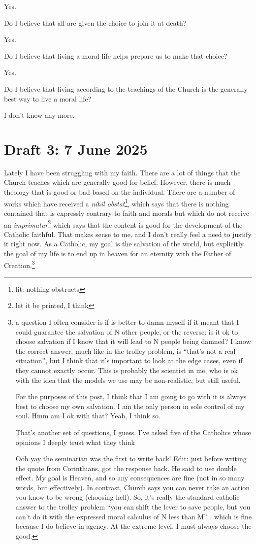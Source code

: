 \documentclass[12pt]{article}
\newcommand{\say}[1]{``#1''}
\renewcommand{\,}{\textsuperscript{,}}
\begin{document}
Yes.

Do I believe that all are given the choice to join it at death?

Yes.

Do I believe that living a moral life helps prepare us to make that choice?

Yes.

Do I believe that living according to the teachings of the Church is the generally best way to live a moral life?

I don't know any more.

\section{Draft 3: 7 June 2025}

Lately I have been struggling with my faith.  
There are a lot of things that the Church teaches which are generally good for belief.  
However, there is much theology that is good or bad based on the individual.  
There are a number of works which have received a \textit{nihil obstat}\footnote{lit: nothing obstructs}, which says that there is nothing contained that is expressly contrary to faith and morals but which do not receive an \textit{imprimatur}\footnote{let it be printed, I think} which says that the content is good for the development of the Catholic faithful.  
That makes sense to me, and I don't really feel a need to justify it right now.  
As a Catholic, my goal is the salvation of the world, but explicitly the goal of my life is to end up in heaven for an eternity with the Father of Creation.\footnote{a question I often consider is if is better to damn myself if it meant that I could guarantee the salvation of N other people, or the reverse: is it ok to choose salvation if I know that it will lead to N people being damned? I know the correct answer, much like in the trolley problem, is \say{that's not a real situation}, but I think that it's important to look at the edge cases, even if they cannot exactly occur.  
This is probably the scientist in me, who is ok with the idea that the models we use may be non-realistic, but still useful.

For the purposes of this post, I think that I am going to go with it is always best to choose my own salvation.  
I am the only person in sole control of my soul.  
Hmm am I ok with that?  
Yeah, I think so.

That's another set of questions, I guess. I've asked five of the Catholics whose opinions I deeply trust what they think  
  
Ooh yay the seminarian was the first to write back! Edit: just before writing the quote from Corinthians, got the response back.  
He said to use double effect. My goal is Heaven, and so any consequences are fine (not in so many words, but effectively). In contrast, Church says you can never take an action you know to be wrong (choosing hell). So, it's really the standard catholic answer to the trolley problem \say{you can shift the lever to save people, but you can't do it with the expressed moral calculus of N less than M}... which is fine because I do believe in agency. At the extreme level, I must always choose the good.}
\end{document}

